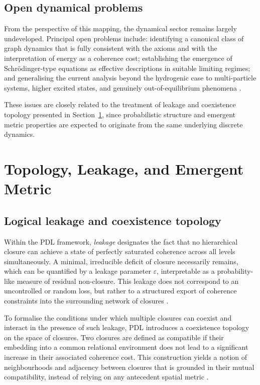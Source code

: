 \documentclass{article}
\begin{document}
\subsection{Open dynamical problems}
\label{subsec:dynamical_open}

From the perspective of this mapping, the dynamical sector remains largely undeveloped. Principal open problems include: identifying a canonical class of graph dynamics that is fully consistent with the axioms and with the interpretation of energy as a coherence cost; establishing the emergence of Schr\"odinger-type equations as effective descriptions in suitable limiting regimes; and generalising the current analysis beyond the hydrogenic case to multi-particle systems, higher excited states, and genuinely out-of-equilibrium phenomena
\cite{Coherence_Leakage_18_2026,PDL_position}.

These issues are closely related to the treatment of leakage and coexistence topology presented in Section~\ref{sec:topology_metric}, since probabilistic structure and emergent metric properties are expected to originate from the same underlying discrete dynamics.

\section{Topology, Leakage, and Emergent Metric}
\label{sec:topology_metric}

\subsection{Logical leakage and coexistence topology}
\label{subsec:leakage_coexistence}

Within the PDL framework, \emph{leakage} designates the fact that no hierarchical closure can achieve a state of perfectly saturated coherence across all levels simultaneously. A minimal, irreducible deficit of closure necessarily remains, which can be quantified by a leakage parameter \(\varepsilon\), interpretable as a probability-like measure of residual non-closure. This leakage does not correspond to an uncontrolled or random loss, but rather to a structured export of coherence constraints into the surrounding network of closures \cite{Coherence_Leakage_18_2026,PDL_Main_2026}.

To formalise the conditions under which multiple closures can coexist and interact in the presence of such leakage, PDL introduces a coexistence topology on the space of closures. Two closures are defined as compatible if their embedding into a common relational environment does not lead to a significant increase in their associated coherence cost. This construction yields a notion of neighbourhoods and adjacency between closures that is grounded in their mutual compatibility, instead of relying on any antecedent spatial metric \cite{Coherence_Leakage_18_2026,PDL_position}.
\end{document}
